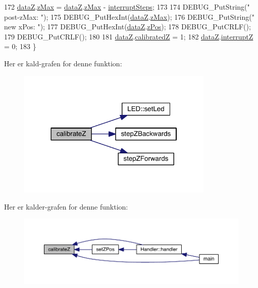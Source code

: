 \begin{DoxyCode}
172   \hyperlink{data_8h_ace1aa5b973b9358f7236c0c9deca9370}{dataZ}.\hyperlink{data_8h_a73591b48f5bcc31997bc92dc465d6696}{zMax} = \hyperlink{data_8h_ace1aa5b973b9358f7236c0c9deca9370}{dataZ}.\hyperlink{data_8h_a73591b48f5bcc31997bc92dc465d6696}{zMax} - \hyperlink{z_8h_a319d8f8cbb816fc1ca2306587712b0b7}{interruptSteps};
173   
174   DEBUG\_PutString(\textcolor{stringliteral}{" post-zMax: "});
175   DEBUG\_PutHexInt(\hyperlink{data_8h_ace1aa5b973b9358f7236c0c9deca9370}{dataZ}.\hyperlink{data_8h_a73591b48f5bcc31997bc92dc465d6696}{zMax});
176   DEBUG\_PutString(\textcolor{stringliteral}{" new xPos: "});
177   DEBUG\_PutHexInt(\hyperlink{data_8h_ace1aa5b973b9358f7236c0c9deca9370}{dataZ}.\hyperlink{data_8h_aafb6592f063176df6830ef1f1e29ae72}{zPos});
178   DEBUG\_PutCRLF();
179   DEBUG\_PutCRLF();
180   
181   \hyperlink{data_8h_ace1aa5b973b9358f7236c0c9deca9370}{dataZ}.\hyperlink{data_8h_ae018a4b3f38c25bf309a70bfa3c2b47b}{calibratedZ} = 1;
182   \hyperlink{data_8h_ace1aa5b973b9358f7236c0c9deca9370}{dataZ}.\hyperlink{data_8h_ad31cb1c3240ac1f76fc3faa902b49c24}{interruptZ} = 0;
183 \}
\end{DoxyCode}


Her er kald-\/grafen for denne funktion\+:
\nopagebreak
\begin{figure}[H]
\begin{center}
\leavevmode
\includegraphics[width=266pt]{d7/d97/class_z_a75e9200c2d48803f4bb723bd1fea24ea_cgraph}
\end{center}
\end{figure}




Her er kalder-\/grafen for denne funktion\+:
\nopagebreak
\begin{figure}[H]
\begin{center}
\leavevmode
\includegraphics[width=350pt]{d7/d97/class_z_a75e9200c2d48803f4bb723bd1fea24ea_icgraph}
\end{center}
\end{figure}


